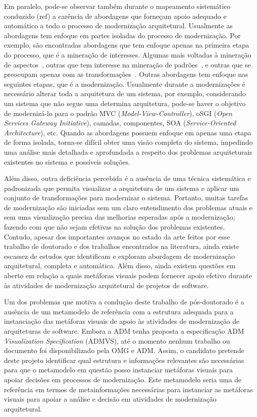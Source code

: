 \documentclass[12pt]{article}
\begin{document}
Em paralelo, pode-se observar também durante o mapeamento sistemático conduzido (ref) a carência de abordagens que forneçam apoio adequado e automático a todo o processo de modernização arquitetural. Usualmente as abordagens tem enfoque em partes isoladas do processo de modernização. Por exemplo, são encontradas abordagens que tem enfoque apenas na primeira etapa do processo, que é a mineração de interesses. Algumas mais voltadas à mineração de aspectos~\cite{...}, outras que tem interesse na mineração de padrões~\cite{}, e outras que se preocupam apenas com as transformações~\cite{}. Outras abordagens tem enfoque nas seguintes etapas, que é a modernização. Usualmente durante a modernizações é necessário alterar toda a arquitetura de um sistema, por exemplo, considerando um sistema que não segue uma determina arquitetura, pode-se haver o objetivo de modernizá-lo para o padrão MVC (\textit{Model-View-Controller}), oSGI (\textit{Open Services Gateway Initiative}), camadas, componentes, SOA (\textit{Service-Oriented Architecture}), etc. Quando as abordagens possuem enfoque em apenas uma etapa de forma isolada, torna-se difícil obter uma visão completa do sistema, impedindo uma análise mais detalhada e aprofundada a respeito dos problemas arquiteturais existentes no sistema e possíveis soluções.

Além disso, outra deficiência percebida é a ausência de uma técnica sistemática e padronizada que permita visualizar a arquitetura de um sistema e aplicar um conjunto de transformações para modernizar o sistema. Portanto, muitas tarefas de modernização são iniciadas sem um claro entendimento dos problemas atuais e sem uma visualização precisa das melhorias esperadas após a modernização; fazendo com que não sejam efetivas na solução dos problemas existentes. Contudo, apesar dos importantes avanços no estado da arte feitos por esse trabalho de doutorado e dos trabalhos encontrados na literatura, ainda existe escassez de estudos que identificam e exploram abordagem de modernização arquitetural, completa e automática. Além disso, ainda existem questões em aberto em relação a quais metáforas visuais podem fornecer apoio efetivo durante às atividades de modernização arquitetural de projetos de software.

Um dos problemas que motiva a condução deste trabalho de pós-doutorado é a ausência de um metamodelo de referência com a estrutura adequada para a instanciação das metáforas visuais de apoio às atividades de modernização de arquiteturas de software. Embora a ADM tenha proposta a especificação ADM \textit{Visualization Specification} (ADMVS), até o momento nenhum trabalho ou documento foi disponibilizado pela OMG e ADM. Assim, o candidato pretende deste projeto identificar qual estrutura e informações relevantes são necessárias para que o metamodelo em questão posso instanciar metáforas visuais para apoiar decisões em processos de modernização. Este metamodelo seria uma de referência em termos de metainformações necessárias para instanciar as metáforas visuais para apoiar a análise e decisão em atividades de modernização arquitetural. 
\end{document}
